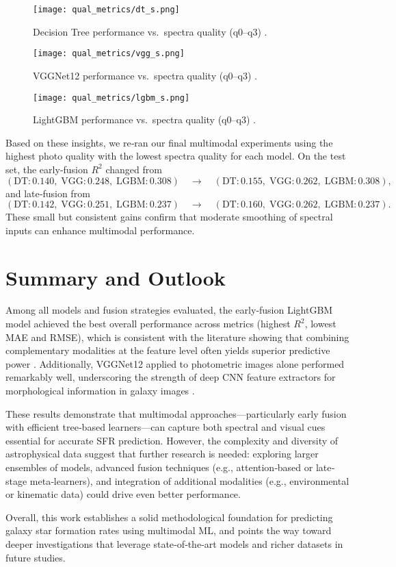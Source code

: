 \documentclass[english,bachelor,oneside]{ctufit-thesis}
\begin{document}
\begin{figure}[H]
  \centering
  \texttt{[image: qual\_metrics/dt\_s.png]}
  \caption{Decision Tree performance vs.\ spectra quality (q0–q3) \cite{DTq}.}
  \label{fig:spec_quality_dt}
\end{figure}
\begin{figure}[H]
  \centering
  \texttt{[image: qual\_metrics/vgg\_s.png]}
  \caption{VGGNet12 performance vs.\ spectra quality (q0–q3) \cite{VGGq}.}
  \label{fig:spec_quality_vgg}
\end{figure}
\begin{figure}[H]
  \centering
  \texttt{[image: qual\_metrics/lgbm\_s.png]}
  \caption{LightGBM performance vs.\ spectra quality (q0–q3) \cite{lgbmq}.}
  \label{fig:spec_quality_lgbm}
\end{figure}

Based on these insights, we re‐ran our final multimodal experiments using the highest photo quality with the lowest spectra quality for each model. On the test set, the early‐fusion $R^2$ changed from 
\[
(\text{DT}:0.140,\;\text{VGG}:0.248,\;\text{LGBM}:0.308)\quad\rightarrow\quad
(\text{DT}:0.155,\;\text{VGG}:0.262,\;\text{LGBM}:0.308),
\]
and late‐fusion from 
\[
(\text{DT}:0.142,\;\text{VGG}:0.251,\;\text{LGBM}:0.237)\quad\rightarrow\quad
(\text{DT}:0.160,\;\text{VGG}:0.262,\;\text{LGBM}:0.237).
\]
These small but consistent gains confirm that moderate smoothing of spectral inputs can enhance multimodal performance.


\section{Summary and Outlook}
Among all models and fusion strategies evaluated, the early‐fusion LightGBM model achieved the best overall performance across metrics (highest $R^2$, lowest MAE and RMSE), which is consistent with the literature showing that combining complementary modalities at the feature level often yields superior predictive power \cite{zhao2024deep}. Additionally, VGGNet12 applied to photometric images alone performed remarkably well, underscoring the strength of deep CNN feature extractors for morphological information in galaxy images \cite{dieleman2015rotation}. 

These results demonstrate that multimodal approaches—particularly early fusion with efficient tree‐based learners—can capture both spectral and visual cues essential for accurate SFR prediction. However, the complexity and diversity of astrophysical data suggest that further research is needed: exploring larger ensembles of models, advanced fusion techniques (e.g., attention‐based or late‐stage meta‐learners), and integration of additional modalities (e.g., environmental or kinematic data) could drive even better performance. 

Overall, this work establishes a solid methodological foundation for predicting galaxy star formation rates using multimodal ML, and points the way toward deeper investigations that leverage state‐of‐the‐art models and richer datasets in future studies.


\backmatter

\printbibliography
\end{document}
